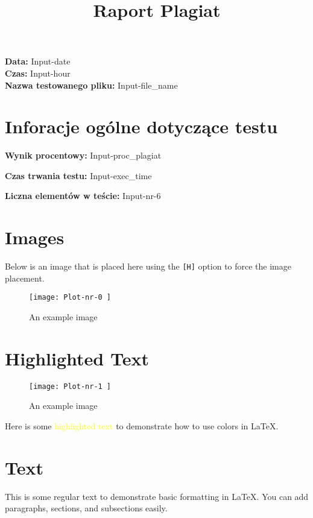 \documentclass{article}
\title{Raport Plagiat}
\date{}
\begin{document}
\maketitle

\begin{center}
    \textbf{Data:} Input-date \\
    \textbf{Czas:} Input-hour \\
    \textbf{Nazwa testowanego pliku:} Input-file_name
\end{center}

\section{Inforacje ogólne dotyczące testu}

\textbf{Wynik procentowy:} Input-proc_plagiat

\textbf{Czas trwania testu:} Input-exec_time

\textbf{Liczna elementów w teście:} Input-nr-6


\section{Images}

Below is an image that is placed here using the \texttt{[H]} option to force the image placement.

\begin{figure}[H]
\centering
\texttt{[image:  Plot-nr-0 ]}
\caption{An example image}
\end{figure}

\section{Highlighted Text}

\begin{figure}[H]
\centering
\texttt{[image:  Plot-nr-1 ]}
\caption{An example image}
\end{figure}


Here is some \textcolor{yellow}{highlighted text} to demonstrate how to use colors in LaTeX.

\section{Text}

This is some regular text to demonstrate basic formatting in LaTeX. You can add paragraphs, sections, and subsections easily.
\end{document}
